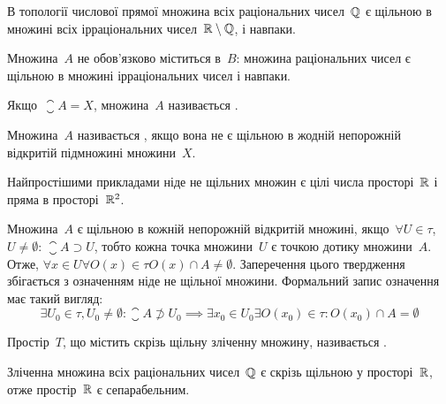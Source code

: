 \begin{example}
    В топології числової прямої множина всіх раціональних чисел~$\mathbb{Q}$ є щільною в множині всіх ірраціональних чисел~$\mathbb{R} \setminus \mathbb{Q}$, і навпаки.
\end{example}

\begin{remark}
    Множина~$A$ не обов'язково міститься в~$B$: множина раціональних чисел є щільною в множині ірраціональних чисел і навпаки.
\end{remark}

\begin{definition}
    Якщо~$\closure A = X$, множина~$A$ називається .
\end{definition}

\begin{definition}
    Множина~$A$ називається , якщо вона не є щільною в жодній непорожній відкритій підмножині множини~$X$.
\end{definition}

\begin{example}
    Найпростішими прикладами ніде не щільних множин є цілі числа просторі~$\mathbb{R}$ і пряма в просторі~$\mathbb{R}^2$.
\end{example}

Множина~$A$ є щільною в кожній непорожній відкритій множині, якщо~$\forall U \in \tau$, $U \ne \emptyset$: $\closure A \supset U$, тобто кожна точка множини~$U$ є точкою дотику множини~$A$. Отже, $\forall x \in U \forall O(x) \in \tau O(x) \cap A \ne \emptyset$. Заперечення цього твердження збігається з означенням ніде не щільної множини. Формальний запис означення має такий вигляд:
\begin{equation*}
    \exists U_0 \in \tau, U_0 \ne \emptyset: \closure A \not\supset U_0 \implies \exists x_0 \in U_0 \exists O(x_0) \in \tau: O(x_0) \cap A = \emptyset
\end{equation*}

\begin{definition}
    Простір~$T$, що містить скрізь щільну зліченну множину, називається .
\end{definition}

\begin{example}
    Зліченна множина всіх раціональних чисел~$\mathbb{Q}$ є скрізь щільною у просторі~$\mathbb{R}$, отже простір~$\mathbb{R}$ є сепарабельним.
\end{example}

